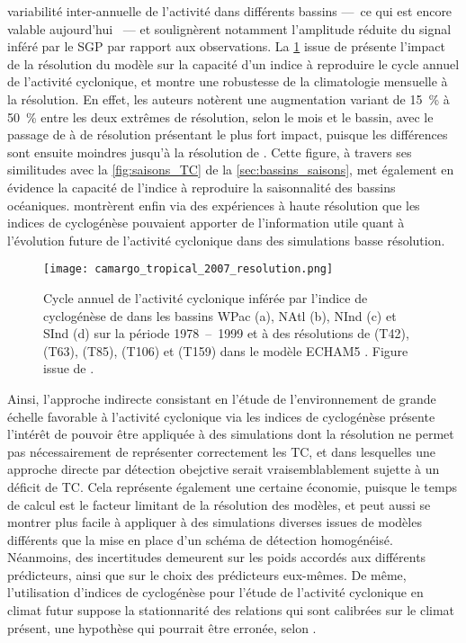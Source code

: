 \documentclass[../main.tex]{subfiles}
\begin{document}
variabilité inter-annuelle de l'activité dans différents bassins ---~ce qui est encore valable aujourd'hui
\parencite{camargo_tropical_2007,menkes_comparison_2012,cavicchia_tropical_2023a}~--- et soulignèrent notamment l'amplitude réduite du signal inféré par le SGP par rapport aux
observations. La \cref{fig:GP_resolution} issue de \textcite{camargo_tropical_2007} présente l'impact de la résolution du modèle sur la capacité d'un indice à
reproduire le cycle annuel de l'activité cyclonique, et montre une robustesse de la climatologie mensuelle à la résolution. En effet, les auteurs notèrent une
augmentation variant de \SI{15}{\percent} à \SI{50}{\percent} entre les deux extrêmes de résolution, selon le mois et le bassin, avec le passage de  à
 de résolution présentant le plus fort impact, puisque les différences sont ensuite moindres jusqu'à la résolution de . Cette figure, à travers
ses similitudes avec la \cref{fig:saisons_TC} de la \cref{sec:bassins_saisons}, met également en évidence la capacité de l'indice à reproduire la saisonnalité
des bassins océaniques. \textcite{mcdonald_tropical_2005,chauvin_response_2006} montrèrent enfin via des expériences à haute résolution que les indices de
cyclogénèse pouvaient apporter de l'information utile quant à l'évolution future de l'activité cyclonique dans des simulations basse résolution.

\begin{figure}[tb]
    \centering
    \texttt{[image: camargo\_tropical\_2007\_resolution.png]}
    \caption{Cycle annuel de l'activité cyclonique inférée par l'indice de cyclogénèse de \textcite{emanuel_tropical_2004} dans les bassins WPac (a), NAtl (b), NInd
    (c) et SInd (d) sur la période \num{1978}~--~\num{1999} et à des résolutions de  (T42),  (T63),  (T85),  (T106) et 
    (T159) dans le modèle ECHAM5 \parencite{roeckner_atmospheric_2003}. Figure issue de \textcite{camargo_tropical_2007}.}
    \label{fig:GP_resolution}
\end{figure}

Ainsi, l'approche indirecte consistant en l'étude de l'environnement de grande échelle favorable à l'activité cyclonique via les indices de cyclogénèse présente
l'intérêt de pouvoir être appliquée à des simulations dont la résolution ne permet pas nécessairement de représenter correctement les TC, et dans lesquelles une
approche directe par détection obejctive serait vraisemblablement sujette à un déficit de TC. Cela représente également une certaine économie, puisque le temps
de calcul est le facteur limitant de la résolution des modèles, et peut aussi se montrer plus facile à appliquer à des simulations diverses issues de modèles
différents que la mise en place d'un schéma de détection homogénéisé. Néanmoins, des incertitudes demeurent sur les poids accordés aux différents prédicteurs,
ainsi que sur le choix des prédicteurs eux-mêmes. De même, l'utilisation d'indices de cyclogénèse pour l'étude de l'activité cyclonique en climat futur suppose
la stationnarité des relations qui sont calibrées sur le climat présent, une hypothèse qui pourrait être erronée, selon
\textcite{nolan_increased_2008,murakami_changes_2013}.
\end{document}
